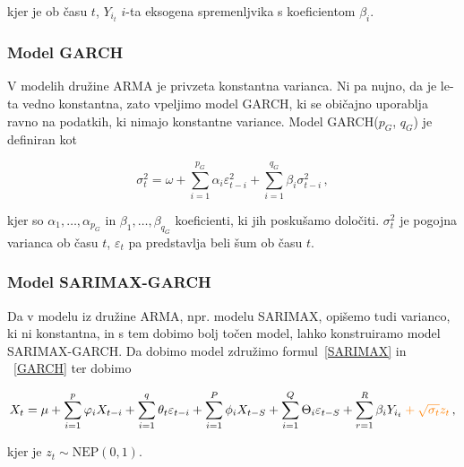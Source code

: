 \documentclass[a4paper, 11pt]{article}
\begin{document}
\noindent kjer je ob času $t$, $Y_{i_t}$ $i$-ta eksogena spremenljvika s koeficientom $\beta_i$. \cite{ARMA_ARIMA_SARIMA_SARIMAX}

\subsubsection{Model GARCH}

V modelih družine ARMA je privzeta konstantna varianca. Ni pa nujno, da je le-ta vedno konstantna, zato
vpeljimo model GARCH, ki se običajno uporablja ravno na podatkih, ki nimajo konstantne variance. 
Model GARCH($p_G$, $q_G$) je definiran kot

\begin{equation}
    \label{GARCH}
    \sigma^2_t = \omega + \sum_{i=1}^{p_G}{\alpha_i \varepsilon_{t-i}^2} + \sum_{i=1}^{q_G}{\beta_i \sigma_{t-i}^2} \,,
\end{equation}

\noindent kjer so $\alpha_1, \dots, \alpha_{p_G}$ in $\beta_1, \dots, \beta_{q_G}$ koeficienti, ki 
jih poskušamo določiti. $\sigma^2_t$ je pogojna varianca ob času $t$, $\varepsilon_t$ pa predstavlja beli šum
ob času $t$. \cite{ArimaGarch}

\subsubsection{Model SARIMAX-GARCH}

\noindent Da v modelu iz družine ARMA, npr. modelu SARIMAX, opišemo tudi varianco, ki ni konstantna, in s tem dobimo bolj
točen model, lahko 
konstruiramo model SARIMAX-GARCH. Da dobimo model združimo formul~\eqref{SARIMAX} in ~\eqref{GARCH} ter dobimo

\begin{equation}
    \label{SARIMAX_GARCH}
    X_t = \mu + \sum_{i=1}^{p}{\varphi_i X_{t-i}} + \sum_{i=1}^{q}{\theta_t \varepsilon_{t-i}} + \sum_{i=1}^{P}{\phi_i X_{t-S}} + \sum_{i=1}^{Q}{\Theta_i \varepsilon_{t-S}}  + \sum_{r=1}^{R}{\beta_i Y_{i_{t}}} \color{orange} + \sqrt{\sigma_t} z_t \color{black} \,,
\end{equation}

\noindent kjer je $z_t \sim \text{NEP}(0,1)$. \cite{ArimaGarch}



\end{document}
